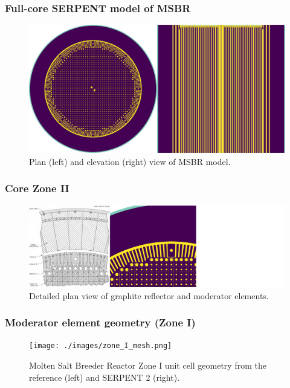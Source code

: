 
\begin{frame}
  \frametitle{Full-core SERPENT model of \gls{MSBR}}
    \begin{figure}[t]
                \vspace*{-0.2in}
                   \hspace*{-0.39in}
                \includegraphics[height=0.6\textwidth]{./images/geometry_main_views.png}
                \caption{Plan (left) and elevation (right) view of MSBR model.}
      \end{figure}
     
\end{frame}

\begin{frame}
  \frametitle{Core Zone II}
  \begin{figure}[t]
     \vspace{-0.25in}
       \hspace*{-0.43in}
       \includegraphics[height=0.77\textheight]{./images/reflector_and_elements.png}
            \caption{Detailed plan view of graphite reflector and moderator elements.}
  \end{figure}
           \vspace{-0.1in}
\end{frame}

\begin{frame}
  \frametitle{Moderator element geometry (Zone I)}
    \begin{figure}[t]
                \vspace*{-0.2in}
                   \hspace*{-0.37in}
                \texttt{[image: ./images/zone\_I\_mesh.png]}
                \vspace*{-0.05in}
                \caption{Molten Salt Breeder Reactor Zone I unit cell geometry from the reference \cite{robertson_conceptual_1971} (left) and SERPENT 2 (right).}
      \end{figure}
     
\end{frame}



